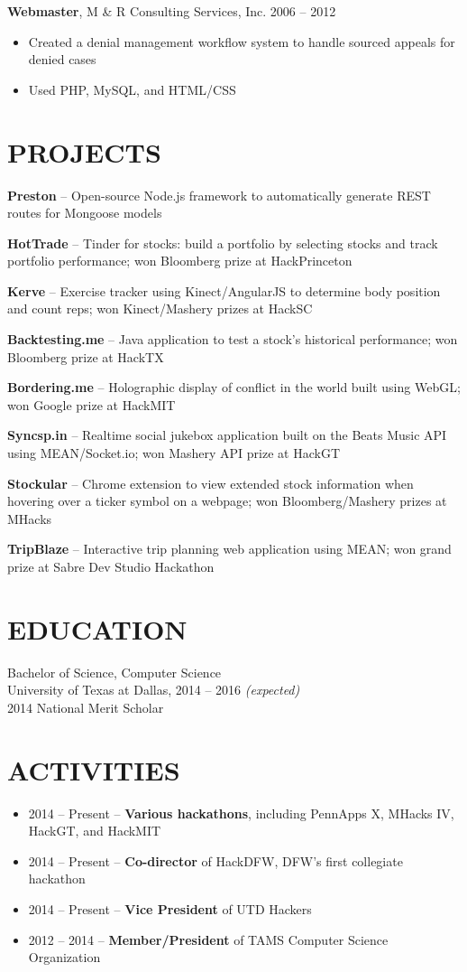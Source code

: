 \documentclass{res} %
\begin{document}
{\bf Webmaster}, M \& R Consulting Services, Inc. \hfill 2006 -- 2012
\begin{itemize} \itemsep -2pt
  \item Created a denial management workflow system to handle sourced appeals for denied cases
  \item Used PHP, MySQL, and HTML/CSS
\end{itemize} 

\section{PROJECTS}

\textbf{Preston} -- Open-source Node.js framework to automatically generate REST routes for Mongoose models

\textbf{HotTrade} -- Tinder for stocks: build a portfolio by selecting stocks and track portfolio performance; won Bloomberg prize at HackPrinceton

\textbf{Kerve} -- Exercise tracker using Kinect/AngularJS to determine body position and count reps; won Kinect/Mashery prizes at HackSC

\textbf{Backtesting.me} -- Java application to test a stock's historical performance; won Bloomberg prize at HackTX

\textbf{Bordering.me} -- Holographic display of conflict in the world built using WebGL; won Google prize at HackMIT

\textbf{Syncsp.in} -- Realtime social jukebox application built on the Beats Music API using MEAN/Socket.io; won Mashery API prize at HackGT

\textbf{Stockular} -- Chrome extension to view extended stock information when hovering over a ticker symbol on a webpage; won Bloomberg/Mashery prizes at MHacks

\textbf{TripBlaze} -- Interactive trip planning web application using MEAN; won grand prize at Sabre Dev Studio Hackathon

\section{EDUCATION}

Bachelor of Science, Computer Science \\
University of Texas at Dallas, 2014 -- 2016 \textit {(expected)} \\
2014 National Merit Scholar

\section{ACTIVITIES} 

\begin{itemize} \itemsep -2pt
  \item 2014 -- Present -- \textbf{Various hackathons}, including PennApps X, MHacks IV, HackGT, and HackMIT
  \item 2014 -- Present -- \textbf{Co-director} of HackDFW, DFW's first collegiate hackathon
  \item 2014 -- Present -- \textbf{Vice President} of UTD Hackers
  \item 2012 -- 2014 -- \textbf{Member/President} of TAMS Computer Science Organization
\end{itemize}
\end{document}
